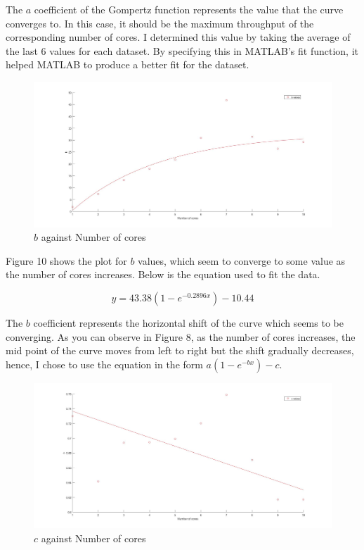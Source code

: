 \documentclass[a4paper,11pt]{article}
\begin{document}
\noindent The $a$ coefficient of the Gompertz function represents the value that the curve converges to. In this case, it should be the maximum throughput of the corresponding number of cores. I determined this value by taking the average of the last 6 values for each dataset. By specifying this in MATLAB's fit function, it helped MATLAB to produce a better fit for the dataset.

\begin{figure}[H]
	\hspace{-2.8cm}
	\includegraphics[scale=0.3]{images/multicore_b}
	\caption{$b$ against Number of cores}
\end{figure}

\noindent Figure 10 shows the plot for $b$ values, which seem to converge to some value as the number of cores increases. Below is the equation used to fit the data.

\begin{equation}
y = 43.38(1-e^{-0.2896x})-10.44
\end{equation}

\noindent The $b$ coefficient represents the horizontal shift of the curve which seems to be converging. As you can observe in Figure 8, as the number of cores increases, the mid point of the curve moves from left to right but the shift gradually decreases, hence, I chose to use the equation in the form $a(1-e^{-bx})-c$.

\begin{figure}[H]
	\hspace{-2.8cm}
	\includegraphics[scale=0.3]{images/multicore_c}
	\caption{$c$ against Number of cores}
\end{figure}
\end{document}
